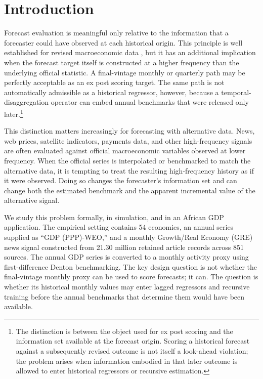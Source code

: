 \documentclass[preprint,12pt,authoryear]{elsarticle}
\begin{document}
\section{Introduction}
Forecast evaluation is meaningful only relative to the information that a forecaster could have observed at each historical origin. This principle is well established for revised macroeconomic data \citep{croushorestark2001,croushore2006}, but it has an additional implication when the forecast target itself is constructed at a higher frequency than the underlying official statistic. A final-vintage monthly or quarterly path may be perfectly acceptable as an ex post scoring target. The same path is not automatically admissible as a historical regressor, however, because a temporal-disaggregation operator can embed annual benchmarks that were released only later.\footnote{The distinction is between the object used for ex post scoring and the information set available at the forecast origin. Scoring a historical forecast against a subsequently revised outcome is not itself a look-ahead violation; the problem arises when information embodied in that later outcome is allowed to enter historical regressors or recursive estimation.}

This distinction matters increasingly for forecasting with alternative data. News, web prices, satellite indicators, payments data, and other high-frequency signals are often evaluated against official macroeconomic variables observed at lower frequency. When the official series is interpolated or benchmarked to match the alternative data, it is tempting to treat the resulting high-frequency history as if it were observed. Doing so changes the forecaster's information set and can change both the estimated benchmark and the apparent incremental value of the alternative signal.

We study this problem formally, in simulation, and in an African GDP application. The empirical setting contains 54 economies, an annual series supplied as ``GDP (PPP)-WEO,'' and a monthly Growth/Real Economy (GRE) news signal constructed from 21.30 million retained article records across 851 sources. The annual GDP series is converted to a monthly activity proxy using first-difference Denton benchmarking. The key design question is not whether the final-vintage monthly proxy can be used to score forecasts; it can. The question is whether its historical monthly values may enter lagged regressors and recursive training before the annual benchmarks that determine them would have been available.
\end{document}
